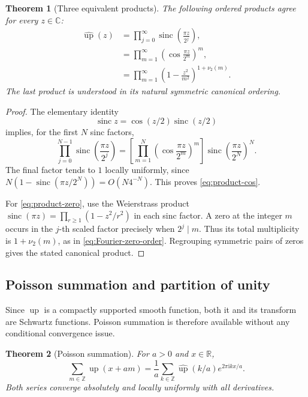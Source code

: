 \documentclass[11pt,oneside]{article}
\newtheorem{theorem}{Theorem}[section]
\theoremstyle{definition}
\theoremstyle{remark}
\newcommand{\upf}{\operatorname{up}}
\newcommand{\sinc}{\operatorname{sinc}}
\newcommand{\ii}{\mathrm i}
\newcommand{\Z}{\mathbb Z}
\newcommand{\R}{\mathbb R}
\newcommand{\C}{\mathbb C}
\newcommand{\Fourier}{\widehat{\upf}}
\begin{document}
\begin{theorem}[Three equivalent products]\label{thm:three-products}
The following ordered products agree for every $z\in\C$:
\begin{align}
  \Fourier(z)
  &=\prod_{j=0}^{\infty}\sinc\left(\frac{\pi z}{2^j}\right),
    \label{eq:product-sinc}\\
  &=\prod_{m=1}^{\infty}
    \left(\cos\frac{\pi z}{2^m}\right)^m,
    \label{eq:product-cos}\\
  &=\prod_{m=1}^{\infty}
    \left(1-\frac{z^2}{m^2}\right)^{1+\nu_2(m)}.
    \label{eq:product-zero}
\end{align}
The last product is understood in its natural symmetric canonical ordering.
\end{theorem}

\begin{proof}
The elementary identity
\begin{equation}\label{eq:sinc-half}
  \sinc z=\cos(z/2)\sinc(z/2)
\end{equation}
implies, for the first $N$ sinc factors,
\begin{equation}\label{eq:finite-cos-telescope}
  \prod_{j=0}^{N-1}\sinc\left(\frac{\pi z}{2^j}\right)
  =\left[\prod_{m=1}^{N}
    \left(\cos\frac{\pi z}{2^m}\right)^m\right]
    \sinc\left(\frac{\pi z}{2^N}\right)^N.
\end{equation}
The final factor tends to $1$ locally uniformly, since
$N(1-\sinc(\pi z/2^N))=O(N4^{-N})$.  This proves
\eqref{eq:product-cos}.

For \eqref{eq:product-zero}, use the Weierstrass product
$\sinc(\pi z)=\prod_{r\ge1}(1-z^2/r^2)$ in each sinc factor.  A zero at the
integer $m$ occurs in the $j$-th scaled factor precisely when $2^j\mid m$.
Thus its total multiplicity is $1+\nu_2(m)$, as in
\eqref{eq:Fourier-zero-order}.  Regrouping symmetric pairs of zeros gives the
stated canonical product.
\end{proof}

\subsection{Poisson summation and partition of unity}

Since $\upf$ is a compactly supported smooth function, both it and its transform
are Schwartz functions.  Poisson summation is therefore available without any
conditional convergence issue.

\begin{theorem}[Poisson summation]\label{thm:poisson}
For $a>0$ and $x\in\R$,
\begin{equation}\label{eq:poisson-general}
  \sum_{m\in\Z}\upf(x+am)
  =\frac1a\sum_{k\in\Z}\Fourier(k/a)e^{2\pi\ii kx/a}.
\end{equation}
Both series converge absolutely and locally uniformly with all derivatives.
\end{theorem}
\end{document}
